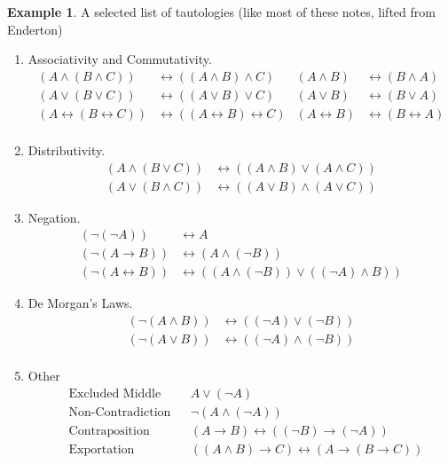 \documentclass[12pt]{article}
\theoremstyle{definition}
\newtheorem{example}[theorem]{Example}
\newcommand{\<}{\langle}
\renewcommand{\>}{\rangle}
\newcommand{\liff}{\leftrightarrow}
\begin{document}
\begin{example}
    A selected list of tautologies (like most of these notes, lifted from Enderton)
    \begin{enumerate}
        \item Associativity and Commutativity.
        \begin{align*}
            (A \land (B \land C)) &\liff ((A \land B) \land C)
                & (A \land B) &\liff (B \land A) \\
            (A \lor (B \lor C)) &\liff ((A \lor B) \lor C)
                & (A \lor B) &\liff (B \lor A) \\
            (A \liff (B \liff C)) &\liff ((A \liff B) \liff C)
                & (A \liff B) &\liff (B \liff A) \\
        \end{align*}
        \item Distributivity.
        \begin{align*}
            (A \land (B \lor C)) &\liff ((A \land B) \lor (A \land C)) \\
            (A \lor (B \land C)) &\liff ((A \lor B) \land (A \lor C))
        \end{align*}
        \item Negation.
        \begin{align*}
            (\lnot(\lnot A)) &\liff A \\
            (\lnot(A \to B)) &\liff (A \land (\lnot B)) \\
            (\lnot(A \liff B)) &\liff ((A \land (\lnot B)) \lor ((\lnot A) \land B))
        \end{align*}
        \item De Morgan's Laws.
        \begin{align*}
            (\lnot(A \land B)) &\liff ((\lnot A) \lor (\lnot B)) \\
            (\lnot(A \lor B)) &\liff ((\lnot A) \land (\lnot B)) \\
        \end{align*}
        \item Other
        \begin{align*}
            &\text{Excluded Middle} && A \lor (\lnot A) \\
            &\text{Non-Contradiction} && \lnot(A \land (\lnot A)) \\
            &\text{Contraposition} && (A \to B) \liff ((\lnot B) \to (\lnot A)) \\
            &\text{Exportation} && ((A \land B) \to C) \liff (A \to (B \to C)) \\
        \end{align*}
    \end{enumerate}
\end{example}
\end{document}
